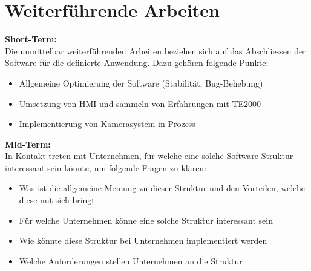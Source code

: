 \section{Weiterführende Arbeiten} \label{Weiterführende_Arbeiten}

	\textbf{Short-Term:}
	\vspace{2mm}  
	\\
	Die unmittelbar weiterführenden Arbeiten beziehen sich auf das Abschliessen der Software für die definierte Anwendung. Dazu gehören folgende Punkte:
	
	\begin{itemize}
		\item Allgemeine Optimierung der Software (Stabilität, Bug-Behebung)
		\item Umsetzung von HMI und sammeln von Erfahrungen mit TE2000
		\item Implementierung von Kamerasystem in Prozess
	\end{itemize}
	
	\vspace{3mm}  
	
	\textbf{Mid-Term:}
	\vspace{2mm}  
	\\
	In Kontakt treten mit Unternehmen, für welche eine solche Software-Struktur interessant sein könnte, um folgende Fragen zu klären: 
	
	\begin{itemize}
		\item Was ist die allgemeine Meinung zu dieser Struktur und den Vorteilen, welche diese mit sich bringt
		\item Für welche Unternehmen könne eine solche Struktur interessant sein
		\item Wie könnte diese Struktur bei Unternehmen implementiert werden
		\item Welche Anforderungen stellen Unternehmen an die Struktur
	\end{itemize}
	
	\vspace{3mm}  
	

